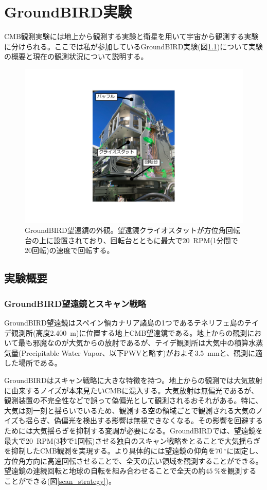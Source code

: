 \chapter{GroundBIRD実験}
\label{chapter2}

CMB観測実験には地上から観測する実験と衛星を用いて宇宙から観測する実験に分けられる。ここでは私が参加しているGroundBIRD実験(図\ref{GB_overview})について実験の概要と現在の観測状況について説明する。

\begin{figure}[htbp]
  \centering
  \includegraphics[width=0.5\columnwidth]{3_GB/figs/GB_overview2.pdf}
  \caption{GroundBIRD望遠鏡の外観。望遠鏡クライオスタットが方位角回転台の上に設置されており、回転台とともに最大で\SI{20}{RPM}(1分間で20回転)の速度で回転する。}
  \label{GB_overview}
\end{figure}
\section{実験概要}

\subsection{GroundBIRD望遠鏡とスキャン戦略}
GroundBIRD望遠鏡はスペイン領カナリア諸島の1つであるテネリフェ島のテイデ観測所(高度\SI{2,400}{m})に位置する地上CMB望遠鏡である。地上からの観測において最も邪魔なのが大気からの放射であるが、テイデ観測所は大気中の積算水蒸気量(Precipitable Water Vapor、以下PWVと略す)がおよそ\SI{3.5}{mm}\cite{PWV}と、観測に適した場所である。

GroundBIRDはスキャン戦略に大きな特徴を持つ。地上からの観測では大気放射に由来するノイズが本来見たいCMBに混入する。大気放射は無偏光であるが、観測装置の不完全性などで誤って偽偏光として観測されるおそれがある。特に、大気は刻一刻と揺らいでいるため、観測する空の領域ごとで観測される大気のノイズも揺らぎ、偽偏光を検出する影響は無視できなくなる。その影響を回避するためには大気揺らぎを抑制する変調が必要になる。GroundBIRDでは、望遠鏡を最大で\SI{20}{RPM}(3秒で1回転)させる独自のスキャン戦略をとることで大気揺らぎを抑制したCMB観測を実現する。より具体的には望遠鏡の仰角を$\SI{70}{^{\circ}}$に固定し、方位角方向に高速回転させることで、全天の広い領域を観測することができる。望遠鏡の連続回転と地球の自転を組み合わせることで全天の約$\SI{45}{\%}$を観測することができる(図\ref{scan_strategy})。

